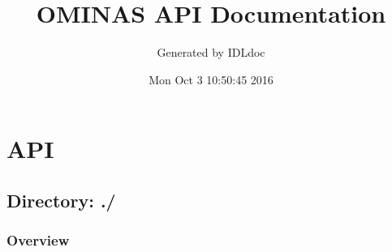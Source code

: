 \documentclass[nols]{idldoc}
\title{OMINAS API Documentation}
\author{Generated by IDLdoc}
\date{Mon Oct  3 10:50:45 2016}
\begin{document}
\maketitle

\tableofcontents





\part{API}


\chapter{Directory: ./}

\section{Overview}





\vspace{2em}






\vspace{2em}


\vspace{2em}
\end{document}
